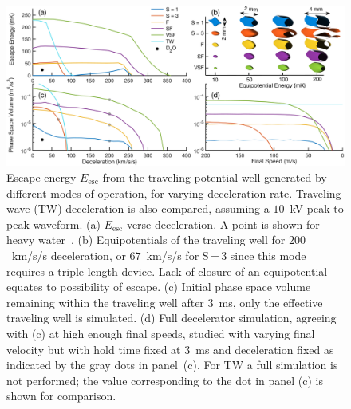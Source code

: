 \documentclass[%
 reprint,
 amsmath,amssymb,
 aps,
prl,
]{revtex4-1}
\begin{document}
\begin{figure}[ht!]
\includegraphics[width=\linewidth]{full-four-panel.png}%
\vspace{-5pt}
\caption{
Escape energy $E_\text{esc}$ from the traveling potential well generated by different modes of operation, for varying deceleration rate.
Traveling wave (TW) deceleration is also compared, assuming a $10$~kV peak to peak waveform. 
(a) $E_\text{esc}$ verse deceleration. A point is shown for heavy water~\cite{Motsch2009}.
(b) Equipotentials of the traveling well for $200$~km/s/s deceleration, or $67$~km/s/s for S\,=\,3 since this mode requires a triple length device.
Lack of closure of an equipotential equates to possibility of escape. 
(c) Initial phase space volume remaining within the traveling well after $3$~ms, only the effective traveling well is simulated. 
(d) Full decelerator simulation, agreeing with (c) at high enough final speeds, studied with varying final velocity but with hold time fixed at $3$~ms and deceleration fixed as indicated by the gray dots in panel~(c).
For TW a full simulation is not performed; the value corresponding to the dot in panel (c) is shown for comparison.\vspace{-4mm}}
\label{fig:efftrap}
\end{figure}
\end{document}
